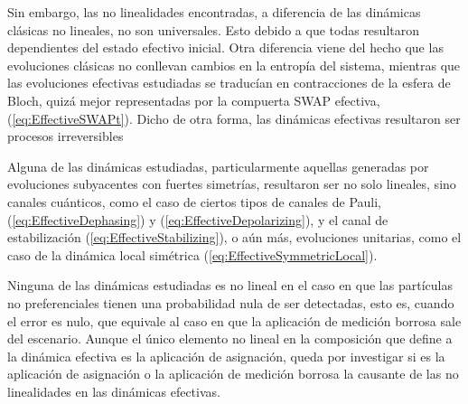  Sin embargo, las no linealidades encontradas, a diferencia de las dinámicas clásicas no lineales, no son universales. Esto debido a que todas resultaron dependientes del estado efectivo inicial. 
%
Otra diferencia viene del hecho que las evoluciones clásicas  no conllevan cambios en la entropía del sistema, mientras que las evoluciones efectivas estudiadas se traducían en contracciones de la esfera de Bloch, quizá mejor representadas por la compuerta SWAP efectiva, (\ref{eq:EffectiveSWAPt}). Dicho de otra forma, las dinámicas efectivas resultaron ser procesos irreversibles 

Alguna de las dinámicas estudiadas, particularmente aquellas generadas por evoluciones subyacentes con fuertes simetrías, resultaron ser no solo lineales, sino canales cuánticos, como el caso de ciertos tipos de canales de Pauli, (\ref{eq:EffectiveDephasing}) y (\ref{eq:EffectiveDepolarizing}), y el canal de estabilización (\ref{eq:EffectiveStabilizing}), o aún más, evoluciones unitarias, como el caso de la dinámica local simétrica (\ref{eq:EffectiveSymmetricLocal}). 

Ninguna de las dinámicas estudiadas es no lineal en el caso en que las partículas no preferenciales tienen una probabilidad nula de ser detectadas, esto es, cuando el error es nulo, que equivale al caso en que la aplicación de medición borrosa sale del escenario. Aunque el único elemento no lineal en la composición que define a la dinámica efectiva es la aplicación de asignación, queda por investigar si es la aplicación de asignación o la aplicación de medición borrosa la causante de las no linealidades en las dinámicas efectivas.

